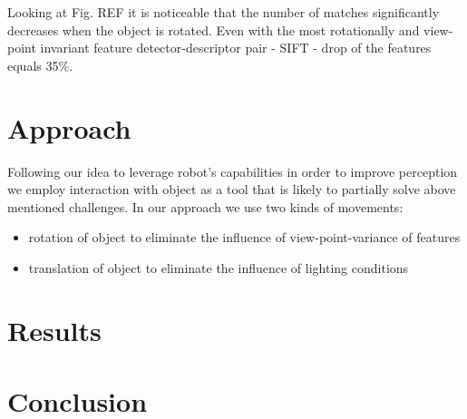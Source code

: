 Looking at Fig. REF it is noticeable that the number of matches significantly decreases when the object is rotated. Even with the most rotationally and view-point invariant feature detector-descriptor pair - SIFT - drop of the features equals 35$\%$.


\section{Approach}

Following our idea to leverage robot's capabilities in order to improve perception we employ interaction with object as a tool that is likely to partially solve above mentioned challenges. In our approach we use two kinds of movements:

\begin{itemize}
\item rotation of object to eliminate the influence of view-point-variance of features
\item translation of object to eliminate the influence of lighting conditions
\end{itemize}




\section{Results}
\section{Conclusion}